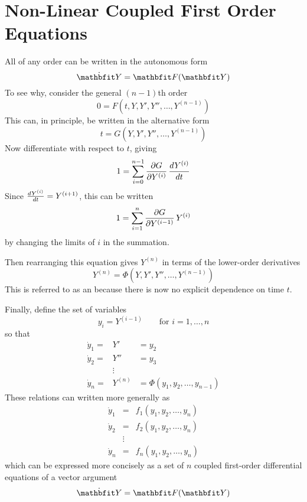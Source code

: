 %
%
%
%
%

\chapter[Non-Linear Coupled 1st Order Equations]{Non-Linear Coupled 
First Order Equations}
\label{nlc chp}

All \ODEs of any order can be written in the autonomous form
$$\dot{\vect{Y}}=\vect{F}(\vect{Y})$$
To see why, consider the general $(n-1)$th order \ODE 
$$0=F(t, Y, Y', Y'', \ldots, Y^{(n-1)})$$
This can, in principle, be written in the alternative form
$$t=G(Y, Y', Y'', \ldots, Y^{(n-1)})$$
Now differentiate with respect to $t$, giving
$$1=\sum_{i=0}^{n-1} \frac{\partial G}{\partial Y^{(i)}}\,\frac{dY^{(i)}}{dt}$$
Since $\frac{dY^{(i)}}{dt}=Y^{(i+1)}$, this can be written
$$1=\sum_{i=1}^n \frac{\partial G}{\partial Y^{(i-1)}}\,Y^{(i)}$$
by changing the limits of $i$ in the summation.  

Then rearranging this equation gives $Y^{(n)}$ in terms of the lower-order
derivatives
$$Y^{(n)}=\Phi(Y, Y',Y'',\ldots, Y^{(n-1)})$$
This is referred to as an  because there is now no
explicit dependence on time $t$.

Finally, define the set of variables
$$y_i=Y^{(i-1)}\qquad\mbox{for $i=1,\ldots,n$}$$
so that
\begin{eqnarray*}
\dot{y}_1=&Y'&=y_2\\
\dot{y}_2=&Y''&=y_3\\
&\vdots&\\
\dot{y}_n=&Y^{(n)}&=\Phi(y_1,y_2,\ldots,y_{n-1})
\end{eqnarray*}
These relations can written more generally as
\begin{eqnarray*}
\dot{y}_1&=&f_1(y_1,y_2,\ldots,y_{n})\\
\dot{y}_2&=&f_2(y_1,y_2,\ldots,y_{n})\\
&\vdots&\\
\dot{y}_n&=&f_n(y_1,y_2,\ldots,y_{n})
\end{eqnarray*}
which can be expressed more concisely as a set of $n$ coupled first-order
differential equations of a vector argument
$$\dot{\vect{Y}}=\vect{F}(\vect{Y})$$

